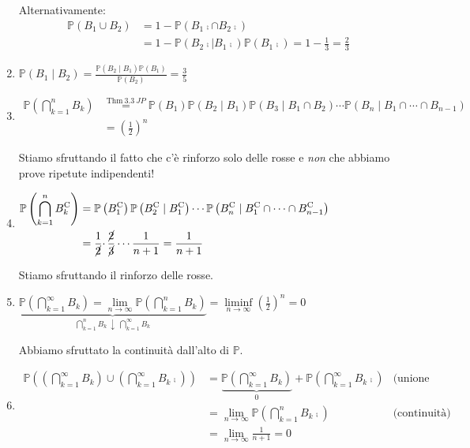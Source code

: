 \begin{enumerate}
Alternativamente:\begin{equation*}
\begin{aligned}
\mathbb{P}( B_{1} \cup B_{2}) & =1-\mathbb{P}\left( B_{1}\comp \cap B_{2}\comp\right)\\
 & =1-\mathbb{P}\left( B_{2}\comp \mid B_{1}\comp\right)\mathbb{P}\left( B_{1}\comp\right) =1-\frac{1}{3} =\frac{2}{3}
\end{aligned}
\end{equation*}
\item $\mathbb{P}( B_{1} \mid B_{2}) =\frac{\mathbb{P}( B_{2} \mid B_{1})\mathbb{P}( B_{1})}{\mathbb{P}( B_{2})} =\frac{3}{5}$
\item $\begin{aligned}
\mathbb{P}\left(\bigcap\limits _{k=1}^{n} B_{k}\right) & \overset{\text{Thm} \ 3.3\ JP}{=}\mathbb{P}( B_{1})\mathbb{P}( B_{2} \mid B_{1})\mathbb{P}( B_{3} \mid B_{1} \cap B_{2}) \cdots \mathbb{P}( B_{n} \mid B_{1} \cap \cdots \cap B_{n-1})\\
 & =\left(\frac{1}{2}\right)^{n}
\end{aligned}$

Stiamo sfruttando il fatto che c'è rinforzo solo delle rosse e \textit{non} che abbiamo prove ripetute indipendenti!
\item $\begin{aligned}
\mathbb{P}\left(\bigcap\limits _{k=1}^{n} B_{k}^{\mathrm{C}}\right) & =\mathbb{P}\left( B_{1}^{\mathrm{C}}\right)\mathbb{P}\left( B_{2}^{\mathrm{C}} \mid B_{1}^{\mathrm{C}}\right) \cdots \mathbb{P}\left( B_{n}^{\mathrm{C}} \mid B_{1}^{\mathrm{C}} \cap \cdots \cap B_{n-1}^{\mathrm{C}}\right)\\
 & =\frac{1}{\cancel{2}} \cdotp \frac{\cancel{2}}{\cancel{3}} \cdots \frac{1}{n+1} =\frac{1}{n+1}
\end{aligned}$

Stiamo sfruttando il rinforzo delle rosse.
\item $\underbrace{\mathbb{P}\left(\bigcap\limits _{k=1}^{\infty } B_{k}\right) =\lim\limits _{n\rightarrow \infty }\mathbb{P}\left(\bigcap\limits _{k=1}^{n} B_{k}\right)}_{\bigcap _{k=1}^{n} B_{k} \ \downarrow \ \bigcap _{k=1}^{\infty } B_{k}} =\liminf\limits _{n\rightarrow \infty }\left(\frac{1}{2}\right)^{n} =0$

Abbiamo sfruttato la continuità dall'alto di $\mathbb{P}$.
\item $\begin{aligned}
\mathbb{P}\left(\left(\bigcap\limits _{k=1}^{\infty } B_{k}\right) \cup \left(\bigcap\limits _{k=1}^{\infty } B_{k}\comp\right)\right) & =\underbrace{\mathbb{P}\left(\bigcap\limits _{k=1}^{\infty } B_{k}\right)}_{0} +\mathbb{P}\left(\bigcap\limits _{k=1}^{\infty } B_{k}\comp\right) & \text{(unione disgiunta)}\\
 & =\lim\limits _{n\rightarrow \infty }\mathbb{P}\left(\bigcap\limits _{k=1}^{n} B_{k}\comp\right) & \text{(continuità)}\\
 & =\lim\limits _{n\rightarrow \infty }\frac{1}{n+1} =0 & 
\end{aligned}$
\end{enumerate}
\Soluzione